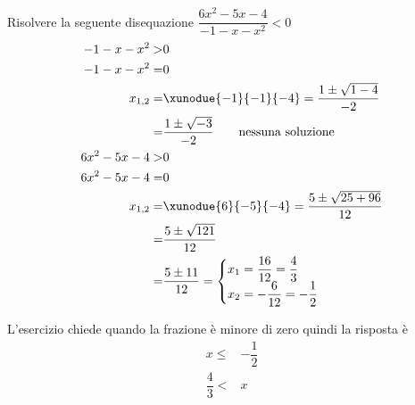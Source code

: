 	Risolvere la seguente disequazione $\dfrac{6x^2-5x-4}{-1-x-x^2}< 0$
\begin{align*}
-1-x-x^2>&0\\
-1-x-x^2=&0\\
x_{1,2}=&\xunodue{-1}{-1}{-4}=\dfrac{1\pm\sqrt{1-4}}{-2}\\
=&\dfrac{1\pm\sqrt{-3}}{-2}
\qquad\text{nessuna soluzione}\\
6x^2-5x-4>&0\\
6x^2-5x-4=&0\\
x_{1,2}=&\xunodue{6}{-5}{-4}=\dfrac{5\pm\sqrt{25+96}}{12}\\
=&\dfrac{5\pm\sqrt{121}}{12}\\
=&\dfrac{5\pm 11}{12}=\begin{cases}
x_1=\dfrac{16}{12}=\dfrac{4}{3}\\
x_2=-\dfrac{6}{12}=-\dfrac{1}{2}
\end{cases}\\
\end{align*}
\begin{center}
	
\end{center}
L'esercizio chiede quando la frazione è minore di zero quindi la risposta è
\begin{align*}
x\leq& -\dfrac{1}{2}\\  \dfrac{4}{3}<&x\\
\end{align*}
